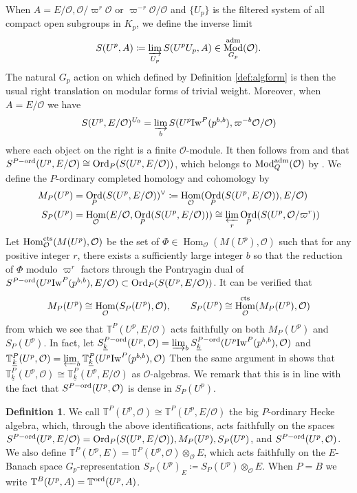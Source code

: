 \documentclass[leqno]{amsart}
\theoremstyle{definition}
\newtheorem{defn}[thm]{Definition}
\theoremstyle{remark}
\newcommand{\oo}{\mathcal{O}}
\DeclareMathOperator{\Hom}{Hom}
\newcommand{\cts}{\textnormal{cts}}
\DeclareMathOperator{\Mod}{\textnormal{Mod}}
\DeclareMathOperator{\Ord}{Ord} %
\newcommand{\adm}{\textnormal{adm}}
\newcommand{\wt}[1]{\underline{ #1 }}
\newcommand{\Iw}{\textnormal{Iw}} %
\newcommand{\TT}{\mathbb{T}} %
\newcommand{\ord}{\textnormal{ord}} %
\begin{document}
When $A=E/\oo, \oo/\varpi^{r}\oo$ or $\varpi^{-r}\oo/\oo$
and $\{U_p\}$ is the filtered system of
all compact open subgroups in $K_p$, 
we define the inverse limit
\begin{equation}\label{eq:complete}
	S(U^p,A)\coloneqq
	\varinjlim_{U_p}S(U^pU_p,A)\in 
	\Mod^{\adm}_{G_p}(\oo).
\end{equation}
The natural $G_p$ action on which
defined by Definition \ref{def:algform}
is then the usual right translation
on modular forms of trivial weight.
Moreover, when $A=E/\oo$ we have
\[
	S(U^p,E/\oo)^{U_0}=
	\varinjlim_{b}
	S(U^p\Iw^P(p^{b,b}),\varpi^{-b}\oo/\oo)
\]
where each object on the right is 
a finite $\oo$-module.
It then follows from \cite[Lem 3.1.5]{emeI} and \cite[Prop 3.2.4]{emeI}
that $S^{P-\ord}(U^p,E/\oo)\cong \Ord_P(S(U^p,E/\oo))$,
which belongs to $\Mod^{\adm}_Q(\oo)$
by \cite[Thm 3.3.3]{emeI}.
We define the $P$-ordinary completed homology and cohomology by
\begin{align}\label{eq:completed_coh}
	M_P(U^p)&=
	\Ord_P(S(U^p,E/\oo))^\vee
	\coloneqq \Hom_\oo(\Ord_P(S(U^p,E/\oo)),E/\oo)\\
	S_P(U^p)&=\Hom_\oo(E/\oo, \Ord_P(S(U^p,E/\oo)))
	\cong \varprojlim_r \Ord_P(S(U^p,\oo/\varpi^{r}))
\end{align}
Let $\Hom_\oo^{\cts}(M(U^p),\oo)$
be the set of
$\Phi\in \Hom_\oo(M(U^p),\oo)$ 
such that for any positive integer $r$,
there exists a sufficiently large integer $b$ so that 
the reduction of $\Phi$ modulo $\varpi^r$
factors through
the Pontryagin dual of 
$S^{P-\ord}(U^p\Iw^P(p^{b,b}),E/\oo)\subset \Ord_P(S(U^p,E/\oo))$. 
It can be verified that 
\begin{equation}\label{eq:complete_isom}
	M_P(U^p)\cong \Hom_\oo(S_P(U^p),\oo),\qquad
	S_P(U^p)\cong \Hom_\oo^{\cts}(M_P(U^p),\oo)
\end{equation}
from which we see that
$\TT^P(U^p,E/\oo)$ acts faithfully
on both $M_P(U^p)$ and  $S_P(U^p)$.
In fact, 
let $S_{\wt{k}}^{P-\ord}(U^p,\oo)
=\varinjlim_{b}S_{\wt{k}}^{P-\ord}(U^p\Iw^P(p^{b,b}),\oo)$
and 
$\TT^P_{\wt{k}}(U^p,\oo)=
\varprojlim_b\TT_{\wt{k}}^{P}(U^p\Iw^P(p^{b,b}),\oo)$
Then the same argument in \cite[Lem 2.17]{ger}
shows that  $\TT^P_{\wt{k}}(U^p,\oo)\cong \TT^P_{\wt{k}}(U^p,E/\oo)$
as $\oo$-algebras.
We remark that this is in line with the fact that 
$S^{P-\ord}(U^p,\oo)$ is dense in $S_P(U^p)$.

\begin{defn}\label{def:big_hecke}
    We call $\TT^P(U^p,\oo)\cong \TT^P(U^p,E/\oo)$
	the big $P$-ordinary Hecke algebra,
    which, through the above identifications,
    acts faithfully on the spaces
	$S^{P-\ord}(U^p,E/\oo)=\Ord_P(S(U^p,E/\oo)), M_P(U^p), S_P(U^p)$,
	and $S^{P-\ord}(U^p,\oo)$. 
	We also define $\TT^P(U^p,E)=\TT^P(U^p,\oo)\otimes_{\oo}E$,
	which acts faithfully
	on the $E$-Banach space $G_p$-representation
    $S_P(U^p)_E\coloneqq S_P(U^p)\otimes_{\oo}E$.
    When $P=B$ we write 
    $\TT^B(U^p,A)=\TT^{\ord}(U^p,A)$.
\end{defn}
\end{document}
